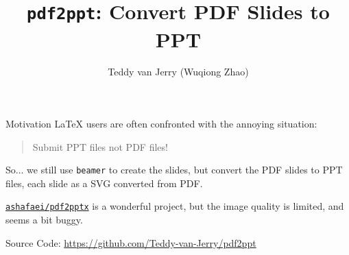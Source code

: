 \documentclass[aspectratio=169, xcolor={dvipsnames}]{beamer}
\title{\texttt{pdf2ppt}: Convert PDF Slides to PPT}
\author{Teddy van Jerry (Wuqiong Zhao)}
\begin{document}
  \maketitle

  \begin{frame}{Motivation}
    \LaTeX{} users are often confronted with the annoying situation:
    \begin{quote}
      \alert{Submit PPT files not PDF files!}
    \end{quote}
    So...
    we still use \texttt{beamer} to create the slides,
    but convert the PDF slides to PPT files, each slide as a SVG converted from PDF.

    \href{https://github.com/ashafaei/pdf2pptx}{\texttt{ashafaei/pdf2pptx}} is a wonderful project,
    but the image quality is limited, and seems a bit buggy.
  \end{frame}

  \begin{frame}[standout]
    Source Code: \url{https://github.com/Teddy-van-Jerry/pdf2ppt}
  \end{frame}
\end{document}
